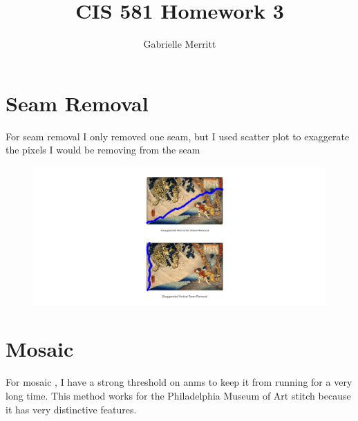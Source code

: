\documentclass[11pt,english]{article}
\title{CIS 581 Homework 3 \\
}
\author{Gabrielle Merritt}
\date{}
\begin{document}
\maketitle
\section*{ Seam Removal}
For seam removal I only removed one seam, but I used scatter plot to exaggerate the pixels I would be removing from the seam  
\begin{figure}[h]
\includegraphics[width = \linewidth]{seam_removal}
\end{figure}

\section*{Mosaic}
For mosaic , I have a strong threshold on anms to keep it from running for a very long time. This method works for the Philadelphia Museum of Art stitch because it has very distinctive features. 
\end{document}
